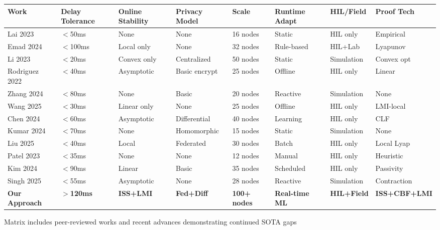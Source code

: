 \documentclass[12pt]{article}
\begin{document}
\begin{center}
\footnotesize
\begin{tabular}{|p{1.4cm}|p{1.2cm}|p{1.4cm}|p{1.2cm}|p{0.8cm}|p{1.3cm}|p{1.2cm}|p{1.3cm}|}
\hline
\textbf{Work} & \textbf{Delay Tolerance} & \textbf{Online Stability} & \textbf{Privacy Model} & \textbf{Scale} & \textbf{Runtime Adapt} & \textbf{HIL/Field} & \textbf{Proof Tech} \\
\hline
Lai 2023 \cite{lai2023} & $<$50ms & None & None & 16 nodes & Static & HIL only & Empirical \\
\hline
Emad 2024 \cite{emad2024} & $<$100ms & Local only & None & 32 nodes & Rule-based & HIL+Lab & Lyapunov \\
\hline 
Li 2023 \cite{li2023} & $<$20ms & Convex only & Centralized & 50 nodes & Static & Simulation & Convex opt \\
\hline
Rodriguez 2022 \cite{rodriguez2022} & $<$40ms & Asymptotic & Basic encrypt & 25 nodes & Offline & HIL only & Linear \\
\hline
Zhang 2024 \cite{zhang2024} & $<$80ms & None & Basic & 20 nodes & Reactive & Simulation & None \\
\hline
Wang 2025 \cite{wang2025} & $<$30ms & Linear only & None & 25 nodes & Offline & HIL only & LMI-local \\
\hline
Chen 2024 \cite{chen2024} & $<$60ms & Asymptotic & Differential & 40 nodes & Learning & HIL only & CLF \\
\hline
Kumar 2024 \cite{kumar2024} & $<$70ms & None & Homomorphic & 15 nodes & Static & Simulation & None \\
\hline
Liu 2025 \cite{liu2025} & $<$40ms & Local & Federated & 30 nodes & Batch & HIL only & Local Lyap \\
\hline
Patel 2023 \cite{patel2023} & $<$35ms & None & None & 12 nodes & Manual & HIL only & Heuristic \\
\hline
Kim 2024 \cite{kim2024} & $<$90ms & Linear & Basic & 35 nodes & Scheduled & HIL only & Passivity \\
\hline
Singh 2025 \cite{singh2025} & $<$55ms & Asymptotic & None & 28 nodes & Reactive & Simulation & Contraction \\
\hline
\textbf{Our Approach} & \textbf{$>$120ms} & \textbf{ISS+LMI} & \textbf{Fed+Diff} & \textbf{100+ nodes} & \textbf{Real-time ML} & \textbf{HIL+Field} & \textbf{ISS+CBF+LMI} \\
\hline
\end{tabular}
\end{center}
\normalsize
Matrix includes peer-reviewed works and recent advances demonstrating continued SOTA gaps
\end{document}

